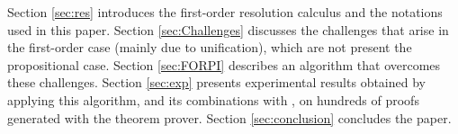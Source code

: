 Section \ref{sec:res} introduces the first-order resolution calculus and the notations used in this paper. Section \ref{sec:Challenges} discusses the challenges that arise in the first-order case (mainly due to unification), which are not present the propositional case. Section \ref{sec:FORPI} describes an algorithm that overcomes these challenges. Section \ref{sec:exp} presents experimental results obtained by applying this algorithm, and its combinations with {\GFOLU}, on hundreds of proofs generated with the {\SPASS} theorem prover. Section \ref{sec:conclusion} concludes the paper.
